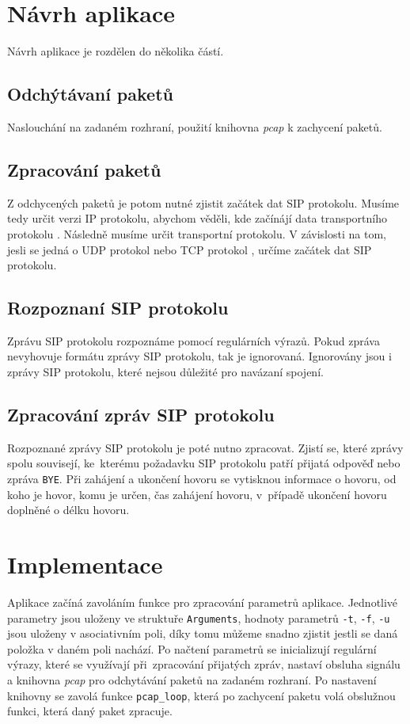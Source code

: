 \documentclass[11pt,a4paper]{article}
\begin{document}
\section{Návrh aplikace}
Návrh aplikace je rozdělen do několika částí.
\subsection{Odchýtávaní paketů}
Naslouchání na zadaném rozhraní, použití knihovna \emph{pcap} k zachycení paketů.
\subsection{Zpracování paketů}
Z odchycených paketů je potom nutné zjistit začátek dat SIP protokolu. 
Musíme tedy určit verzi IP protokolu, abychom věděli, kde začínájí 
data transportního protokolu \cite{rfc791,rfc2460}.
Následně musíme určit transportní protokolu. V závislosti na tom, jesli se jedná
o UDP protokol nebo TCP protokol \cite{rfc768,rfc793}, určíme začátek
dat SIP protokolu.
\subsection{Rozpoznaní SIP protokolu}
Zprávu SIP protokolu rozpoznáme pomocí regulárních výrazů. Pokud
zpráva nevyhovuje formátu zprávy SIP protokolu, tak je ignorovaná. Ignorovány
jsou i zprávy SIP protokolu, které nejsou důležité pro navázaní spojení.

\subsection{Zpracování zpráv SIP protokolu}
Rozpoznané zprávy SIP protokolu je poté nutno zpracovat. Zjistí se, které
zprávy spolu souvisejí, ke~kterému požadavku SIP protokolu patří přijatá
odpověď nebo zpráva \texttt{BYE}. Při zahájení a ukončení hovoru se vytisknou informace
o hovoru, od koho je hovor, komu je určen, čas zahájení hovoru, v~případě ukončení hovoru
doplněné o délku hovoru.

\section{Implementace}
Aplikace začíná zavoláním funkce pro zpracování
parametrů aplikace. Jednotlivé parametry jsou uloženy ve struktuře \texttt{Arguments},
hodnoty parametrů \texttt{-t}, \texttt{-f}, \texttt{-u} jsou uloženy v asociativním poli, díky tomu můžeme
snadno zjistit jestli se daná položka v daném poli nachází.
Po načtení parametrů se inicializují regulární výrazy, které se využívají při~zpracování
přijatých zpráv, nastaví obsluha signálu a knihovna \emph{pcap} pro odchytávání
paketů na zadaném rozhraní. Po nastavení knihovny se zavolá funkce \texttt{pcap\_loop},
která po zachycení paketu volá obslužnou funkci, která daný paket zpracuje.
\end{document}

